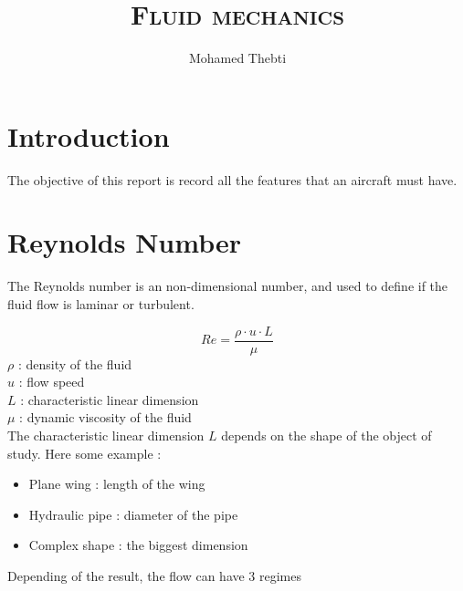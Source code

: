 \documentclass[12pt,a4paper]{article}
\title{
	\Huge\textsc{Fluid mechanics}
}
\author{Mohamed Thebti}
\begin{document}
\setlength{\parindent}{0mm}

\fancyhead[R]{\slshape \leftmark}

\fancyfoot[C]{}
\fancyfoot[R]{\thepage}

\maketitle
\newpage

\tableofcontents

\newpage



\section{Introduction}

The objective of this report is record all the features that an aircraft must have. 


\section{Reynolds Number}

The Reynolds number is an non-dimensional number, and used to define if the fluid flow is laminar or turbulent. 

\begin{equation}
	Re = \frac{\rho \cdot u \cdot L}{\mu}
\end{equation}
$\rho$ : density of the fluid\\
$u$ : flow speed\\
$L$ : characteristic linear dimension\\
$\mu$ : dynamic viscosity of the fluid\\

The characteristic linear dimension $L$ depends on the shape of the object of study. Here some example : 
\begin{itemize}
	\item Plane wing : length of the wing
	\item Hydraulic pipe : diameter of the pipe
	\item Complex shape : the biggest dimension
\end{itemize}
Depending of the result, the flow can have 3 regimes
\end{document}
